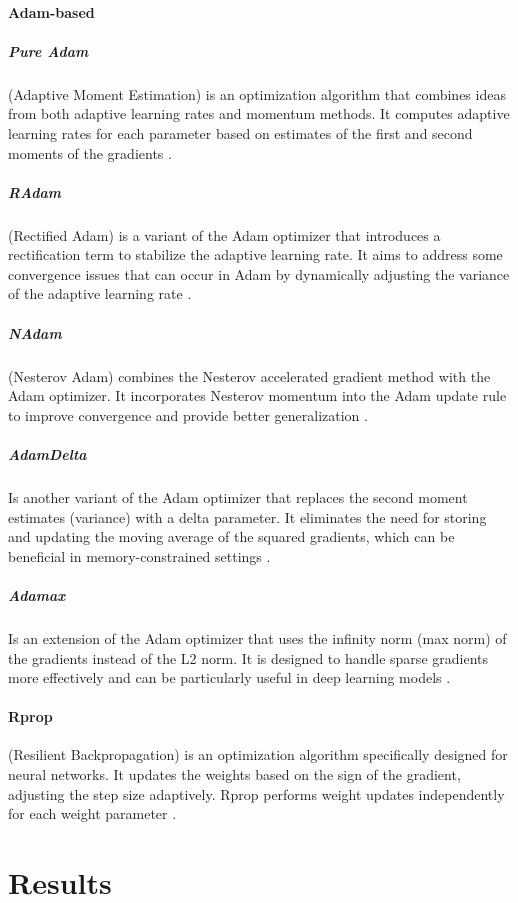 \documentclass[a4paper]{article}
\begin{document}
	\paragraph{Adam-based}
	\subparagraph{Pure Adam}
	(Adaptive Moment Estimation) is an optimization algorithm that combines ideas from both adaptive learning rates and momentum methods.
	It computes adaptive learning rates for each parameter based on estimates of the first and second moments of the gradients \cite{kingma2017}.
	\subparagraph{RAdam}
	(Rectified Adam) is a variant of the Adam optimizer that introduces a rectification term to stabilize the adaptive learning rate.
	It aims to address some convergence issues that can occur in Adam by dynamically adjusting the variance of the adaptive learning rate \cite{liu2021}.
	\subparagraph{NAdam}
	(Nesterov Adam) combines the Nesterov accelerated gradient method with the Adam optimizer.
	It incorporates Nesterov momentum into the Adam update rule to improve convergence and provide better generalization \cite{tato2018}.
	\subparagraph{AdamDelta}
	Is another variant of the Adam optimizer that replaces the second moment estimates (variance) with a delta parameter.
	It eliminates the need for storing and updating the moving average of the squared gradients, which can be beneficial in memory-constrained settings \cite{zeiler2012}.
	\subparagraph{Adamax}
	Is an extension of the Adam optimizer that uses the infinity norm (max norm) of the gradients instead of the L2 norm. It is designed to handle sparse gradients more effectively and can be particularly useful in deep learning models \cite{bera2020}.

	\paragraph{Rprop}
	(Resilient Backpropagation) is an optimization algorithm specifically designed for neural networks.
	It updates the weights based on the sign of the gradient, adjusting the step size adaptively.
	Rprop performs weight updates independently for each weight parameter \cite{Riedmiller1992}.
	
	
	
	\section{Results}
	
\end{document}
